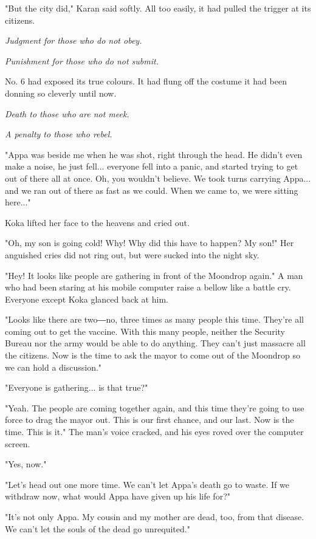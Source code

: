 "But the city did," Karan said softly. All too easily, it had pulled the
trigger at its citizens.

\emph{Judgment for those who do not obey.}

\emph{Punishment for those who do not submit.}

No. 6 had exposed its true colours. It had flung off the costume it had
been donning so cleverly until now.

\emph{Death to those who are not meek.}

\emph{A penalty to those who rebel.}

"Appa was beside me when he was shot, right through the head. He didn't
even make a noise, he just fell... everyone fell into a panic, and
started trying to get out of there all at once. Oh, you wouldn't
believe. We took turns carrying Appa... and we ran out of there as fast
as we could. When we came to, we were sitting here..."

Koka lifted her face to the heavens and cried out.

"Oh, my son is going cold! Why! Why did this have to happen? My son!"
Her anguished cries did not ring out, but were sucked into the night
sky.

"Hey! It looks like people are gathering in front of the Moondrop
again." A man who had been staring at his mobile computer raise a bellow
like a battle cry. Everyone except Koka glanced back at him.

"Looks like there are two―no, three times as many people this time.
They're all coming out to get the vaccine. With this many people,
neither the Security Bureau nor the army would be able to do anything.
They can't just massacre all the citizens. Now is the time to ask the
mayor to come out of the Moondrop so we can hold a discussion."

"Everyone is gathering... is that true?"

"Yeah. The people are coming together again, and this time they're going
to use force to drag the mayor out. This is our first chance, and our
last. Now is the time. This is it." The man's voice cracked, and his
eyes roved over the computer screen.

"Yes, now."

"Let's head out one more time. We can't let Appa's death go to waste. If
we withdraw now, what would Appa have given up his life for?"

"It's not only Appa. My cousin and my mother are dead, too, from that
disease. We can't let the souls of the dead go unrequited."

